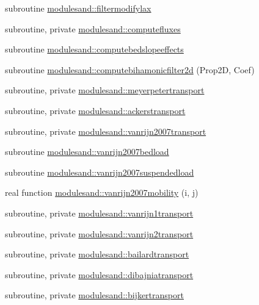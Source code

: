\begin{DoxyCompactItemize}
\item 
subroutine \mbox{\hyperlink{namespacemodulesand_a580330ec253695e422a7fa01ca03e69f}{modulesand\+::filtermodifylax}}
\item 
subroutine, private \mbox{\hyperlink{namespacemodulesand_a5cbe25a8640cb153443de1585837b7a3}{modulesand\+::computefluxes}}
\item 
subroutine \mbox{\hyperlink{namespacemodulesand_a9176419680bd2427b3dbc5e9807c9ca3}{modulesand\+::computebedslopeeffects}}
\item 
subroutine \mbox{\hyperlink{namespacemodulesand_a3ea5b505a0fc6d89be163ff10c0f515e}{modulesand\+::computebihamonicfilter2d}} (Prop2D, Coef)
\item 
subroutine, private \mbox{\hyperlink{namespacemodulesand_a127d449cfb0928af3dd2e7b348aca9cc}{modulesand\+::meyerpetertransport}}
\item 
subroutine, private \mbox{\hyperlink{namespacemodulesand_a982128af256cc6018f1c15e9f2bed5ad}{modulesand\+::ackerstransport}}
\item 
subroutine, private \mbox{\hyperlink{namespacemodulesand_a86c23492690f1972adf61f7f2b36f027}{modulesand\+::vanrijn2007transport}}
\item 
subroutine \mbox{\hyperlink{namespacemodulesand_a977db0c285efea44306fcc4bd320dc10}{modulesand\+::vanrijn2007bedload}}
\item 
subroutine \mbox{\hyperlink{namespacemodulesand_ad4f562b0c7304b99b372a946d8cab5b1}{modulesand\+::vanrijn2007suspendedload}}
\item 
real function \mbox{\hyperlink{namespacemodulesand_a484efe5d2e2a5463e1f1257ca84852b1}{modulesand\+::vanrijn2007mobility}} (i, j)
\item 
subroutine, private \mbox{\hyperlink{namespacemodulesand_abf8eba23882b69da0ba972e0af5b81ad}{modulesand\+::vanrijn1transport}}
\item 
subroutine, private \mbox{\hyperlink{namespacemodulesand_afb5faaa6c12c4db3fe47e079018ed0f7}{modulesand\+::vanrijn2transport}}
\item 
subroutine, private \mbox{\hyperlink{namespacemodulesand_a93c84a69d793110411e83cb30859f0e3}{modulesand\+::bailardtransport}}
\item 
subroutine, private \mbox{\hyperlink{namespacemodulesand_a2daf31a4265bfcae491e0968f275ec7a}{modulesand\+::dibajniatransport}}
\item 
subroutine, private \mbox{\hyperlink{namespacemodulesand_ae86fef0e135985c199efb346e08b85dc}{modulesand\+::bijkertransport}}
\item 

\end{DoxyCompactItemize}

